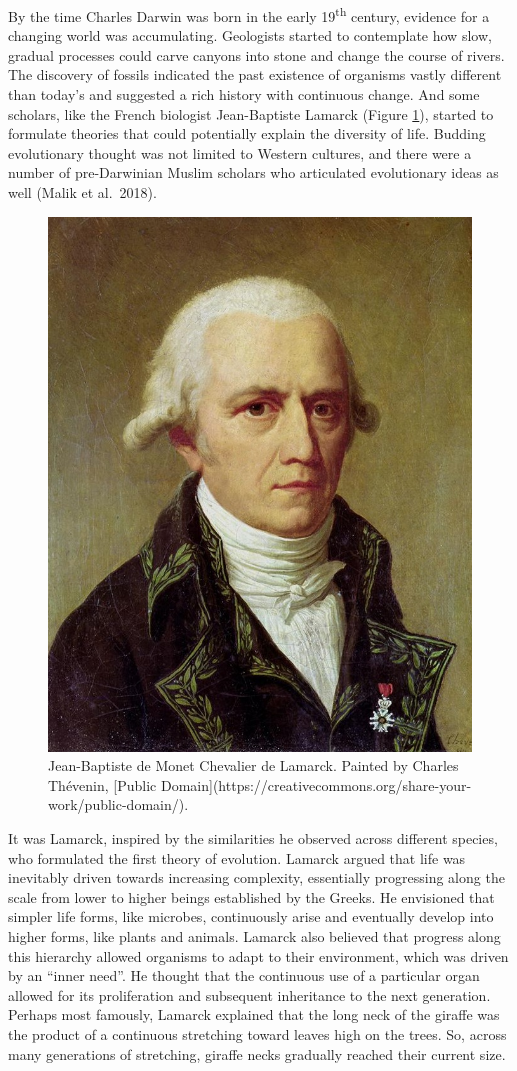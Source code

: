 \documentclass[
]{book}
\begin{document}
By the time Charles Darwin was born in the early 19\textsuperscript{th} century, evidence for a changing world was accumulating. Geologists started to contemplate how slow, gradual processes could carve canyons into stone and change the course of rivers. The discovery of fossils indicated the past existence of organisms vastly different than today's and suggested a rich history with continuous change. And some scholars, like the French biologist Jean-Baptiste Lamarck (Figure \ref{fig:lamarck}), started to formulate theories that could potentially explain the diversity of life. Budding evolutionary thought was not limited to Western cultures, and there were a number of pre-Darwinian Muslim scholars who articulated evolutionary ideas as well (Malik et al.~2018).

\begin{figure}
\includegraphics[width=0.5\linewidth]{images/Jean-Baptiste_de_Lamarck} \caption{Jean-Baptiste de Monet Chevalier de Lamarck. Painted by Charles Thévenin, [Public Domain](https://creativecommons.org/share-your-work/public-domain/).}\label{fig:lamarck}
\end{figure}

It was Lamarck, inspired by the similarities he observed across different species, who formulated the first theory of evolution. Lamarck argued that life was inevitably driven towards increasing complexity, essentially progressing along the scale from lower to higher beings established by the Greeks. He envisioned that simpler life forms, like microbes, continuously arise and eventually develop into higher forms, like plants and animals. Lamarck also believed that progress along this hierarchy allowed organisms to adapt to their environment, which was driven by an ``inner need''. He thought that the continuous use of a particular organ allowed for its proliferation and subsequent inheritance to the next generation. Perhaps most famously, Lamarck explained that the long neck of the giraffe was the product of a continuous stretching toward leaves high on the trees. So, across many generations of stretching, giraffe necks gradually reached their current size.
\end{document}
